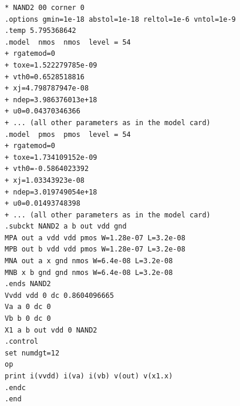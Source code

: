 \begin{verbatim}
* NAND2 00 corner 0
.options gmin=1e-18 abstol=1e-18 reltol=1e-6 vntol=1e-9
.temp 5.795368642
.model  nmos  nmos  level = 54
+ rgatemod=0
+ toxe=1.522279785e-09
+ vth0=0.6528518816
+ xj=4.798787947e-08
+ ndep=3.986376013e+18
+ u0=0.04370346366
+ ... (all other parameters as in the model card)
.model  pmos  pmos  level = 54
+ rgatemod=0
+ toxe=1.734109152e-09
+ vth0=-0.5864023392
+ xj=1.03343923e-08
+ ndep=3.019749054e+18
+ u0=0.01493748398
+ ... (all other parameters as in the model card)
.subckt NAND2 a b out vdd gnd
MPA out a vdd vdd pmos W=1.28e-07 L=3.2e-08
MPB out b vdd vdd pmos W=1.28e-07 L=3.2e-08
MNA out a x gnd nmos W=6.4e-08 L=3.2e-08
MNB x b gnd gnd nmos W=6.4e-08 L=3.2e-08
.ends NAND2
Vvdd vdd 0 dc 0.8604096665
Va a 0 dc 0
Vb b 0 dc 0
X1 a b out vdd 0 NAND2
.control
set numdgt=12
op
print i(vvdd) i(va) i(vb) v(out) v(x1.x)
.endc
.end
\end{verbatim}
